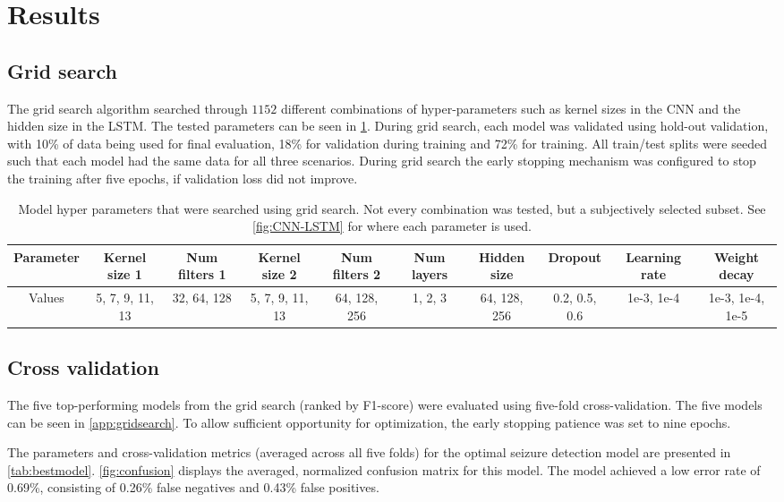 \section{Results}
\subsection{Grid search}
The grid search algorithm searched through $1152$ different combinations of hyper-parameters such as kernel sizes in the CNN and the hidden size in the LSTM. The tested parameters can be seen in \cref{tab:gridsearch}. During grid search, each model was validated using hold-out validation, with 10\% of data being used for final evaluation, 18\% for validation during training and 72\% for training. All train/test splits were seeded such that each model had the same data for all three scenarios. During grid search the early stopping mechanism was configured to stop the training after five epochs, if validation loss did not improve.
\begin{table}[H]
    \caption{Model hyper parameters that were searched using grid search. Not every combination was tested, but a subjectively selected subset. See \cref{fig:CNN-LSTM} for where each parameter is used.}
    \begin{adjustbox}{width=\textwidth}
    \begin{tabular}{|c|c|c|c|c|c|c|c|c|c|}
        \hline
        Parameter & Kernel size 1   & Num filters 1 & Kernel size 2   & Num filters 2 & Num layers & Hidden size  & Dropout        & Learning rate & Weight decay \\
        \hline
        Values     & 5, 7, 9, 11, 13 & 32, 64, 128   & 5, 7, 9, 11, 13 & 64, 128, 256  & 1, 2, 3    & 64, 128, 256 & 0.2, 0.5, 0.6  & 1e-3, 1e-4 & 1e-3, 1e-4, 1e-5 \\
        \hline
    \end{tabular}
    \end{adjustbox}
    \label{tab:gridsearch}
\end{table}
\subsection{Cross validation}
The five top-performing models from the grid search (ranked by F1-score) were evaluated using five-fold cross-validation. The five models can be seen in \cref{app:gridsearch}. To allow sufficient opportunity for optimization, the early stopping patience was set to nine epochs.

The parameters and cross-validation metrics (averaged across all five folds) for the optimal seizure detection model are presented in \cref{tab:bestmodel}. \cref{fig:confusion} displays the averaged, normalized confusion matrix for this model. The model achieved a low error rate of 0.69\%, consisting of 0.26\% false negatives and 0.43\% false positives.

